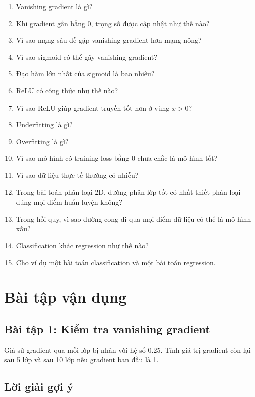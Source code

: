 \documentclass[12pt,a4paper]{report}
\begin{document}
\begin{enumerate}
    \item Vanishing gradient là gì?
    \item Khi gradient gần bằng 0, trọng số được cập nhật như thế nào?
    \item Vì sao mạng sâu dễ gặp vanishing gradient hơn mạng nông?
    \item Vì sao sigmoid có thể gây vanishing gradient?
    \item Đạo hàm lớn nhất của sigmoid là bao nhiêu?
    \item ReLU có công thức như thế nào?
    \item Vì sao ReLU giúp gradient truyền tốt hơn ở vùng $x>0$?
    \item Underfitting là gì?
    \item Overfitting là gì?
    \item Vì sao mô hình có training loss bằng 0 chưa chắc là mô hình tốt?
    \item Vì sao dữ liệu thực tế thường có nhiễu?
    \item Trong bài toán phân loại 2D, đường phân lớp tốt có nhất thiết phân loại đúng mọi điểm huấn luyện không?
    \item Trong hồi quy, vì sao đường cong đi qua mọi điểm dữ liệu có thể là mô hình xấu?
    \item Classification khác regression như thế nào?
    \item Cho ví dụ một bài toán classification và một bài toán regression.
\end{enumerate}

\chapter{Bài tập vận dụng}

\section*{Bài tập 1: Kiểm tra vanishing gradient}

Giả sử gradient qua mỗi lớp bị nhân với hệ số $0.25$. Tính giá trị gradient còn lại sau 5 lớp và sau 10 lớp nếu gradient ban đầu là 1.

\section*{Lời giải gợi ý}
\end{document}
